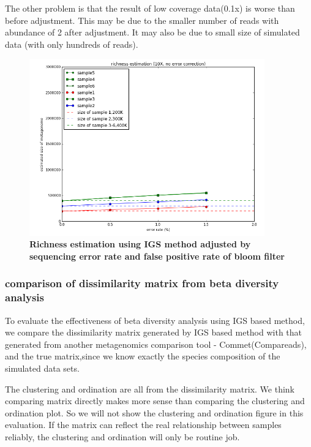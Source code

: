 The other problem is that the result of low coverage data(0.1x) is worse than
before adjustment. This may be due to the smaller number of reads with 
abundance of 2 after adjustment. It may also be due to small size of simulated 
data (with only hundreds of reads).


\begin{figure}[!ht]
 \centerline{\includegraphics[width=4in]{./figures/IGS_richness_adjustment.png}}
\caption{\bf Richness estimation using IGS method adjusted by sequencing error
rate and false positive rate of bloom filter}
\label{fig:IGS_richness_adjustment}
\end{figure}

\subsubsection{comparison of dissimilarity matrix from beta diversity analysis}

To evaluate the effectiveness of beta diversity analysis using IGS based method, we compare the dissimilarity matrix generated by IGS based method with that generated from another metagenomics comparison tool - Commet(Compareads), and the true matrix,since we know exactly the species composition of the simulated data sets.

The clustering and ordination are all from the dissimilarity matrix. We think comparing matrix directly makes more sense than comparing the clustering and ordination plot. So we will not show the clustering and ordination figure in this evaluation. If the matrix can reflect the real relationship between samples reliably, the clustering and ordination will only be routine job.

